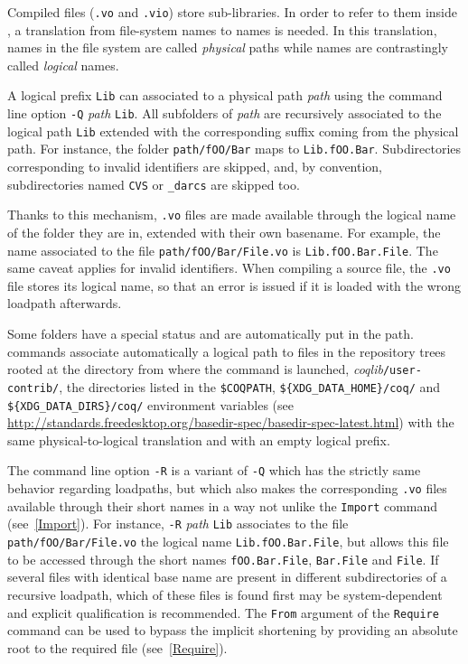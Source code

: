 Compiled files (\texttt{.vo} and \texttt{.vio}) store sub-libraries. In
order to refer to them inside {\Coq}, a translation from file-system
names to {\Coq} names is needed. In this translation, names in the
file system are called {\em physical} paths while {\Coq} names are
contrastingly called {\em logical} names.

A logical prefix {\tt Lib} can associated to a physical path
\textrm{\textsl{path}} using the command line option {\tt -Q}
\textrm{\textsl{path}} {\tt Lib}. All subfolders of {\textsl{path}} are
recursively associated to the logical path {\tt Lib} extended with the
corresponding suffix coming from the physical path. For instance, the
folder {\tt path/fOO/Bar} maps to {\tt Lib.fOO.Bar}. Subdirectories
corresponding to invalid {\Coq} identifiers are skipped, and, by
convention, subdirectories named {\tt CVS} or {\tt \_darcs} are
skipped too.

Thanks to this mechanism, {\texttt{.vo}} files are made available through the
logical name of the folder they are in, extended with their own basename. For
example, the name associated to the file {\tt path/fOO/Bar/File.vo} is
{\tt Lib.fOO.Bar.File}. The same caveat applies for invalid identifiers.
When compiling a source file, the {\texttt{.vo}} file stores its logical name,
so that an error is issued if it is loaded with the wrong loadpath afterwards.

Some folders have a special status and are automatically put in the path.
{\Coq} commands associate automatically a logical path to files
in the repository trees rooted at the directory from where the command
is launched, \textit{coqlib}\texttt{/user-contrib/}, the directories
listed in the \verb:$COQPATH:, \verb:${XDG_DATA_HOME}/coq/: and
\verb:${XDG_DATA_DIRS}/coq/: environment variables (see
\url{http://standards.freedesktop.org/basedir-spec/basedir-spec-latest.html})
with the same physical-to-logical translation and with an empty logical prefix.

The command line option \texttt{-R} is a variant of \texttt{-Q} which has the
strictly same behavior regarding loadpaths, but which also makes the
corresponding \texttt{.vo} files available through their short names in a
way not unlike the {\tt Import} command (see~{\ref{Import}}). For instance,
\texttt{-R} \textrm{\textsl{path}} \texttt{Lib} associates to the file
\texttt{path/fOO/Bar/File.vo} the logical name \texttt{Lib.fOO.Bar.File}, but
allows this file to be accessed through the short names \texttt{fOO.Bar.File},
\texttt{Bar.File} and \texttt{File}. If several files with identical base name
are present in different subdirectories of a recursive loadpath, which of
these files is found first may be system-dependent and explicit
qualification is recommended. The {\tt From} argument of the {\tt Require}
command can be used to bypass the implicit shortening by providing an absolute
root to the required file (see~\ref{Require}).

